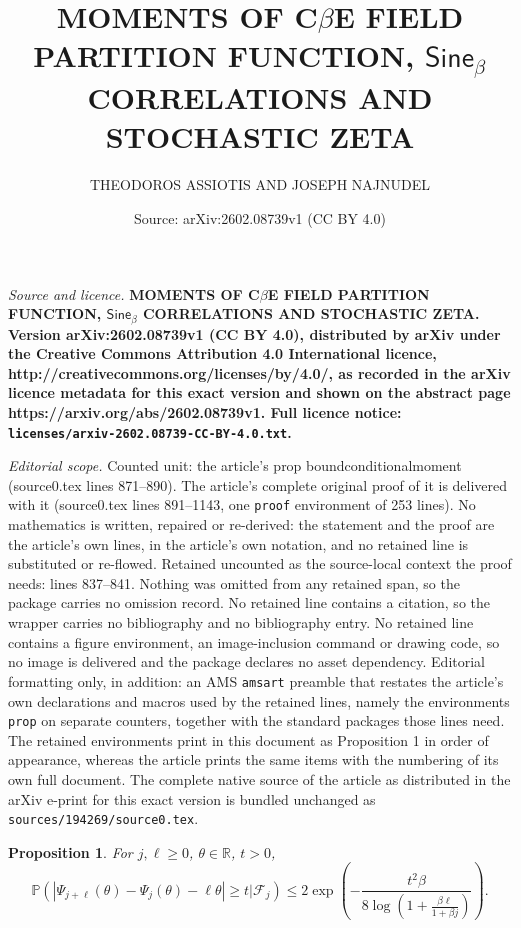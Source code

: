 \documentclass[10pt,a4paper]{amsart}
\title{\large \bf MOMENTS OF C$\beta$E FIELD PARTITION FUNCTION, $\mathsf{Sine}_{\beta}$ CORRELATIONS AND STOCHASTIC ZETA}
\author{\small THEODOROS ASSIOTIS AND JOSEPH NAJNUDEL}
\date{Source: arXiv:2602.08739v1 (CC BY 4.0)}
\newtheorem{prop}{Proposition}
\begin{document}
\maketitle

\noindent\emph{Source and licence.} \large \bf MOMENTS OF C$\beta$E FIELD PARTITION FUNCTION, $\mathsf{Sine}_{\beta}$ CORRELATIONS AND STOCHASTIC ZETA. Version arXiv:2602.08739v1 (CC BY 4.0), distributed by arXiv under the Creative Commons Attribution 4.0 International licence, http://creativecommons.org/licenses/by/4.0/, as recorded in the arXiv licence metadata for this exact version and shown on the abstract page https://arxiv.org/abs/2602.08739v1. Full licence notice: \texttt{licenses/arxiv-2602.08739-CC-BY-4.0.txt}.\par\smallskip

\noindent\textit{Editorial scope.} Counted unit: the article's prop boundconditionalmoment (source0.tex lines 871--890). The article's complete original proof of it is delivered with it (source0.tex lines 891--1143, one \texttt{proof} environment of 253 lines). No mathematics is written, repaired or re-derived: the statement and the proof are the article's own lines, in the article's own notation, and no retained line is substituted or re-flowed.  Retained uncounted as the source-local context the proof needs: lines 837--841.  Nothing was omitted from any retained span, so the package carries no omission record.  No retained line contains a citation, so the wrapper carries no bibliography and no bibliography entry.  No retained line contains a figure environment, an image-inclusion command or drawing code, so no image is delivered and the package declares no asset dependency.  Editorial formatting only, in addition: an AMS \texttt{amsart} preamble that restates the article's own declarations and macros used by the retained lines, namely the environments \texttt{prop} on separate counters, together with the standard packages those lines need.  The retained environments print in this document as Proposition 1 in order of appearance, whereas the article prints the same items with the numbering of its own full document.  The complete native source of the article as distributed in the arXiv e-print for this exact version is bundled unchanged as \texttt{sources/194269/source0.tex}.
\begin{prop} \label{boundlargefluctuationpsi}
For $j, \ell \geq 0$, $\theta \in \mathbb{R}$, $t > 0$, 
$$\mathbb{P} \left(| \Psi_{j+\ell} (\theta) - \Psi_j (\theta) - \ell \theta | \geq t | \mathcal{F}_j \right)
\leq 2 \exp \left( - \frac{t^2 \beta}{8 \log \left(1 + \frac{\beta \ell}{1 + \beta j} \right)}\right).$$
\end{prop}
\end{document}

